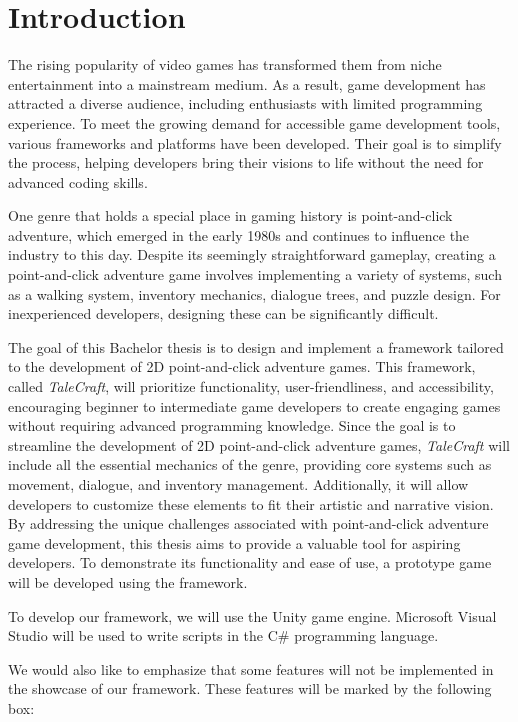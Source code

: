 \chapter{Introduction}
The rising popularity of video games has transformed them from niche entertainment into a mainstream medium. As a result, game development has attracted a diverse audience, including enthusiasts with limited programming experience. To meet the growing demand for accessible game development tools, various frameworks and platforms have been developed. Their goal is to simplify the process, helping developers bring their visions to life without the need for advanced coding skills.

One genre that holds a special place in gaming history is point-and-click adventure, which emerged in the early 1980s and continues to influence the industry to this day. Despite its seemingly straightforward gameplay, creating a point-and-click adventure game involves implementing a variety of systems, such as a walking system, inventory mechanics, dialogue trees, and puzzle design. For inexperienced developers, designing these can be significantly difficult.

The goal of this Bachelor thesis is to design and implement a framework tailored to the development of 2D point-and-click adventure games. This framework, called \textit{TaleCraft}, will prioritize functionality, user-friendliness, and accessibility, encouraging beginner to intermediate game developers to create engaging games without requiring advanced programming knowledge. Since the goal is to streamline the development of 2D point-and-click adventure games, \textit{TaleCraft} will include all the essential mechanics of the genre, providing core systems such as movement, dialogue, and inventory management. Additionally, it will allow developers to customize these elements to fit their artistic and narrative vision. By addressing the unique challenges associated with point-and-click adventure game development, this thesis aims to provide a valuable tool for aspiring developers. To demonstrate its functionality and ease of use, a prototype game will be developed using the framework. 

To develop our framework, we will use the Unity game engine. Microsoft Visual Studio will be used to write scripts in the C\# programming language. 

We would also like to emphasize that some features will not be implemented
in the showcase of our framework. These features will be marked by the following box:

